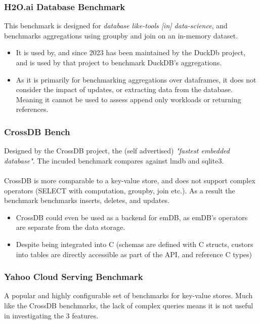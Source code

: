 \subsubsection{H2O.ai Database Benchmark}
This benchmark is designed for \textit{database like-tools [in] data-science}, and benchmarks aggregations
using groupby and join on an in-memory dataset\cite{H2Oai}.
\begin{itemize}
    \setlength\itemsep{0em}
    \item It is used by, and since 2023 has been maintained by the DuckDb project\cite{DuckDBH2O}, and is used by that project to benchmark DuckDB's
          aggregations.
    \item As it is primarily for benchmarking aggregations over dataframes, it does not consider the impact of updates, or extracting
          data from the database. Meaning it cannot be used to assess append only workloads or returning references.
\end{itemize}
\subsubsection{CrossDB Bench}
Designed by the CrossDB project, the (self advertised) \textit{"fastest embedded database"}\cite{CrossDBWebsite}. The incuded benchmark compares against lmdb and sqlite3.
\\
\\ CrossDB is more comparable to a key-value store, and does not support complex operators (SELECT with computation, groupby, join etc.).
As a result the benchmark benchmarks inserts, deletes, and updates.
\begin{itemize}
    \setlength\itemsep{0em}
    \item CrossDB could even be used as a backend for emDB, as emDB's operators are separate from the data storage.
    \item Despite being integrated into C (schemas are defined with C structs, custors into tables are directly accessible as part of the API,
          and reference C types)
\end{itemize}

\subsubsection{Yahoo Cloud Serving Benchmark}
A popular and highly configurable set of benchmarks for key-value stores. Much like the CrossDB
benchmarks, the lack of complex queries means it is not useful in investigating the 3 features.

